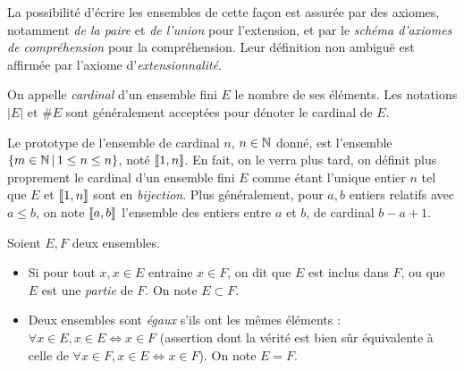 La possibilité d'écrire les ensembles de cette façon est assurée par des axiomes, notamment \emph{de la paire} et \emph{de l'union} pour l'extension, et par le \emph{schéma d'axiomes de compréhension} pour la compréhension. Leur définition non ambiguë est affirmée par l'axiome d'\emph{extensionnalité}.





\begin{dftn}
    On appelle \emph{cardinal} d'un ensemble fini $E$ le nombre de ses éléments. Les notations $|E|$ et $\#E$ sont généralement acceptées pour dénoter le cardinal de $E$.
\end{dftn}

Le prototype de l'ensemble de cardinal $n$, $n \in \mathbb{N}$ donné, est l'ensemble $\{m \in \mathbb{N} \,\vert\, 1 \leq n \leq n\}$, noté $\llbracket {1, n} \rrbracket$. En fait, on le verra plus tard, on définit plus proprement le cardinal d'un ensemble fini $E$ comme étant l'unique entier $n$ tel que $E$ et $\llbracket {1, n} \rrbracket$ sont en \emph{bijection}.
Plus généralement, pour $a, b$ entiers relatifs avec $a\leq b$, on note $\llbracket {a, b} \rrbracket$ l'ensemble des entiers entre $a$ et $b$, de cardinal $b-a+1$.

\begin{dftn}
    Soient $E, F$ deux ensembles.
    \begin{itemize}
        \item Si pour tout $x, x \in E$ entraine $x\in F$, on dit que $E$ est inclus dans $F$, ou que $E$ est une \emph{partie} de $F$. On note $E \subset F$.
        \item Deux ensembles sont \emph{égaux} s'ils ont les mêmes éléments : $\forall x \in E, x \in E \Leftrightarrow x \in F$ (assertion dont la vérité  est bien sûr équivalente à celle de $\forall x \in F, x \in E \Leftrightarrow x \in F$). On note $E = F$.
    \end{itemize}
\end{dftn}

